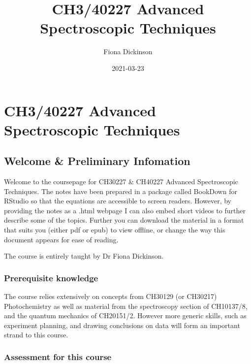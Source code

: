 \documentclass[
]{book}
\title{CH3/40227 Advanced Spectroscopic Techniques}
\author{Fiona Dickinson}
\date{2021-03-23}
\begin{document}
\maketitle

{
\setcounter{tocdepth}{1}
\tableofcontents
}
\hypertarget{ch340227-advanced-spectroscopic-techniques}{%
\chapter*{CH3/40227 Advanced Spectroscopic Techniques}\label{ch340227-advanced-spectroscopic-techniques}}

\hypertarget{welcome-preliminary-infomation}{%
\section*{Welcome \& Preliminary Infomation}\label{welcome-preliminary-infomation}}

Welcome to the coursepage for CH30227 \& CH40227 Advanced Spectroscopic Techniques. The notes have been prepared in a package called BookDown for RStudio so that the equations are accessible to screen readers. However, by providing the notes as a .html webpage I can also embed short videos to further describe some of the topics. Further you can download the material in a format that suits you (either pdf or epub) to view offline, or change the way this document appears for ease of reading.

The course is entirely taught by Dr Fiona Dickinson.

\hypertarget{prerequisite-knowledge}{%
\subsection*{Prerequisite knowledge}\label{prerequisite-knowledge}}

The course relies extensively on concepts from CH30129 (or CH30217) Photochemistry as well as material from the spectroscopy section of CH10137/8, and the quantum mechanics of CH20151/2. However more generic skills, such as experiment planning, and drawing conclusions on data will form an important strand to this course.

\hypertarget{assessment-for-this-course}{%
\subsection*{Assessment for this course}\label{assessment-for-this-course}}
\end{document}
